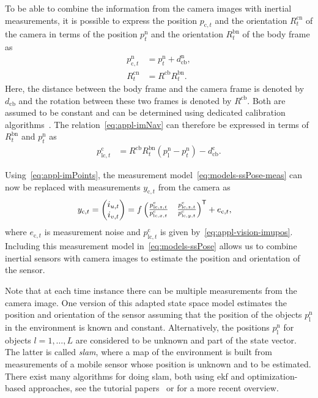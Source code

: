 To be able to combine the information from the camera images with inertial measurements, it is possible to express the position $p_{\text{c},t}$ and the orientation $R^\text{cn}_t$ of the camera in terms of the position $p^\text{n}_{t}$ and the orientation $R^\text{bn}_{t}$ of the body frame as
\begin{subequations}
\label{eq:appl-vision-cambody}
\begin{align}
p^\text{n}_{\text{c},t} &= p^\text{n}_{t} + d_\text{cb}^\text{n}, \\
R^\text{cn}_{t} &= R^\text{cb} R^\text{bn}_{t}.
\end{align}
\end{subequations}
Here, the distance between the body frame and the camera frame is denoted by $d_\text{cb}$ and the rotation between these two frames is denoted by $R^\text{cb}$. Both are assumed to be constant and can be determined using dedicated calibration algorithms~\cite{holSG:2010b,loboD:2007,kellyS:2011,mirzaeiR:2008,rehderS:2017}. The relation~\eqref{eq:appl-imNav} can therefore be expressed in terms of $R^\text{bn}_{t}$ and $p^\text{n}_{t}$ as
\begin{align}
\label{eq:appl-vision-imupos}
p_{\text{lc},t}^\text{c} &= R^\text{cb} R^\text{bn}_t \left( p^\text{n}_\text{l} - p^\text{n}_{t} \right) - d_\text{cb}^\text{c}.
\end{align}

Using~\eqref{eq:appl-imPoints}, the measurement model~\eqref{eq:models-ssPose-meas} can now be replaced with measurements $y_{\text{c},t}$ from the camera as
\begin{align}
y_{\text{c},t} &= \begin{pmatrix} i_{u,t} \\ i_{v,t} \end{pmatrix} = f
\begin{pmatrix} \tfrac{p_{\text{lc},z,t}^\text{c}}{p_{\text{lc},x,t}^\text{c}} & \tfrac{p_{\text{lc},z,t}^\text{c}}{p_{\text{lc},y,t}^\text{c}} \end{pmatrix}^{\mathsf{T}} + e_{\text{c},t}, 
\end{align}
where $e_{\text{c},t}$ is measurement noise and $p_{\text{lc},t}^\text{c}$ is given by~\eqref{eq:appl-vision-imupos}. Including this measurement model in~\eqref{eq:models-ssPose} allows us to combine inertial sensors with camera images to estimate the position and orientation of the sensor. 

Note that at each time instance there can be multiple measurements from the camera image. One version of this adapted state space model estimates the position and orientation of the sensor assuming that the position of the objects $p^\text{n}_\text{l}$ in the environment is known and constant. Alternatively, the positions $p^\text{n}_\text{l}$ for objects $l = 1, \hdots, L$ are considered to be unknown and part of the state vector. The latter is called \emph{\gls{slam}}, where a map of the environment is built from measurements of a mobile sensor whose position is unknown and to be estimated. There exist many algorithms for doing \gls{slam}, both using \gls{ekf} and optimization-based approaches, see \eg the tutorial papers~\cite{durrantWhyteB:2006,baileyD:2006} or \cite{cadenaCCLSNRL:2016} for a more recent overview.

